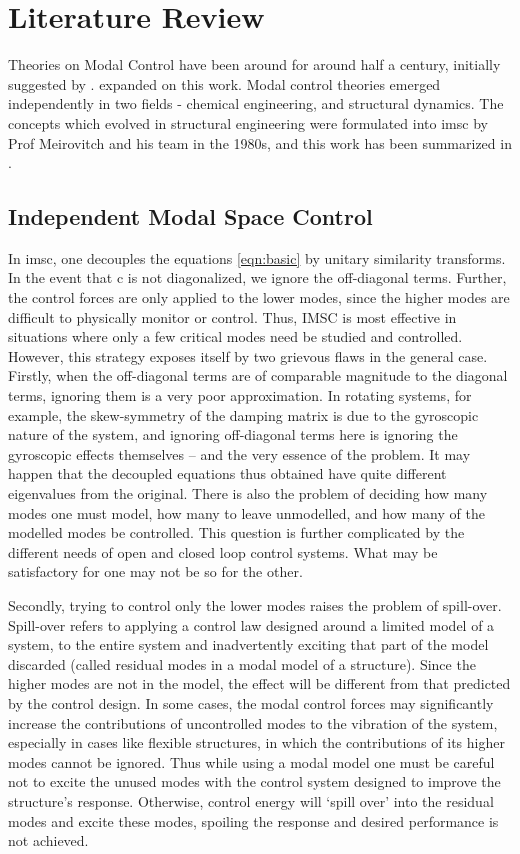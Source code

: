 \chapter{Literature Review}
\label{chap:lit_rev}
Theories on Modal Control have been around for around half a century, initially 
suggested by \citet{Rosen1962}. \citet{Simon1968316} expanded on this work. 
Modal control theories emerged independently in two fields - chemical engineering,
and structural dynamics. The concepts which evolved in structural engineering 
were formulated into \gls{imsc} by Prof Meirovitch and his team in the 1980s, and 
this work has been summarized in \citet{meirovitch1990dynamics}.

\section{Independent Modal Space Control}
\label{sec:lit_imsc}
In \gls{imsc}, one decouples the equations \eqref{eqn:basic} by unitary 
similarity transforms. In the event that \gls{c} is not diagonalized,
we ignore the off-diagonal terms. Further, the control forces are only applied 
to the lower modes, since the higher modes are difficult to physically monitor 
or control. Thus, IMSC is most effective in situations where only a few critical 
modes need be studied and controlled. However, this strategy exposes itself by 
two grievous flaws in the general case. Firstly, when the off-diagonal terms are 
of comparable magnitude to the diagonal terms, ignoring them is a very poor 
approximation. In rotating systems, for example, the skew-symmetry of the 
damping matrix is due to the gyroscopic nature of the system, and ignoring
off-diagonal terms here is ignoring the gyroscopic effects themselves -- and
the very essence of the problem. It may happen that the decoupled equations 
thus obtained have quite different eigenvalues from the original. There is 
also the problem of deciding how many modes one must model, how many to leave 
unmodelled, and how many of the modelled modes be controlled. This question is 
further complicated by the different needs of open and closed loop control 
systems. What may be satisfactory for one may not be so for the other.

Secondly, trying to control only the lower modes raises the problem of spill-over.
Spill-over refers to applying a control law designed around a limited
model of a system, to the entire system and inadvertently exciting that part of the
model discarded (called residual modes in a modal model of a structure). Since the 
higher modes are not in the model, the effect will be different from that predicted
by the control design. In some cases, the modal control forces may significantly 
increase the contributions of uncontrolled modes to the vibration of the system, 
especially in cases like flexible structures, in which the contributions of its 
higher modes cannot be ignored. Thus while using a modal model one must be careful
not to excite the unused modes with the control system designed to improve the 
structure's response. Otherwise, control energy will `spill over' into the residual 
modes and excite these modes, spoiling the response and desired performance is not 
achieved. 

